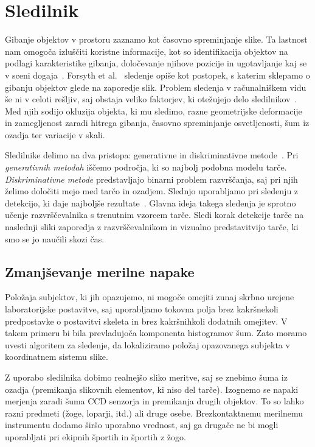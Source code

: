 \section{Sledilnik}
%
Gibanje objektov v prostoru zaznamo kot časovno spreminjanje slike. Ta lastnost nam omogoča izluščiti koristne informacije, kot so identifikacija objektov na podlagi karakteristike gibanja, določevanje njihove pozicije in ugotavljanje kaj se v sceni dogaja~\cite{forsyth2002computer}. Forsyth et al.~\cite{forsyth2002computer} sledenje opiše kot postopek, s katerim sklepamo o gibanju objektov glede na zaporedje slik. Problem sledenja v računalniškem vidu še ni v celoti rešljiv, saj obstaja veliko faktorjev, ki otežujejo delo sledilnikov~\cite{danelljan2014adaptive}. Med njih sodijo okluzija objekta, ki mu sledimo, razne geometrijske deformacije in zamegljenost zaradi hitrega gibanja, časovno spreminjanje osvetljenosti, šum iz ozadja ter variacije v skali. 

Sledilnike delimo na dva pristopa: generativne in diskriminativne metode~\cite{danelljan2014adaptive}. Pri \emph{generativnih metodah} iščemo področja, ki so najbolj podobna modelu tarče. \emph{Diskriminativne metode} predstavljajo binarni problem razvrščanja, saj pri njih želimo določiti mejo med tarčo in ozadjem. Slednjo uporabljamo pri sledenju z detekcijo, ki daje najboljše rezultate~\cite{danelljan2014adaptive}. Glavna ideja takega sledenja je sprotno učenje razvrščevalnika s trenutnim vzorcem tarče. Sledi korak detekcije tarče na naslednji sliki zaporedja z razvrščevalnikom in vizualno predstavitvijo tarče, ki smo se jo naučili skozi čas.






\subsection{Zmanjševanje merilne napake}

Položaja subjektov, ki jih opazujemo, ni mogoče omejiti zunaj skrbno urejene laboratorijske postavitve, saj uporabljamo tokovna polja brez kakršnekoli predpostavke o postavitvi skeleta in brez kakršnihkoli dodatnih omejitev. V takem primeru bi bila prevladujoča komponenta histogramov šum. Zato moramo uvesti algoritem za sledenje, da lokaliziramo položaj opazovanega subjekta v koordinatnem sistemu slike.

Z uporabo sledilnika dobimo realnejšo sliko meritve, saj se znebimo šuma iz ozadja (premikanja slikovnih elementov, ki niso del tarče). Izognemo se napaki merjenja zaradi šuma CCD senzorja in premikanja drugih objektov. To so lahko razni predmeti (žoge, loparji, itd.) ali druge osebe. Brezkontaktnemu merilnemu instrumentu dodamo širšo uporabno vrednost, saj ga drugače ne bi mogli uporabljati pri ekipnih športih in športih z žogo. 


